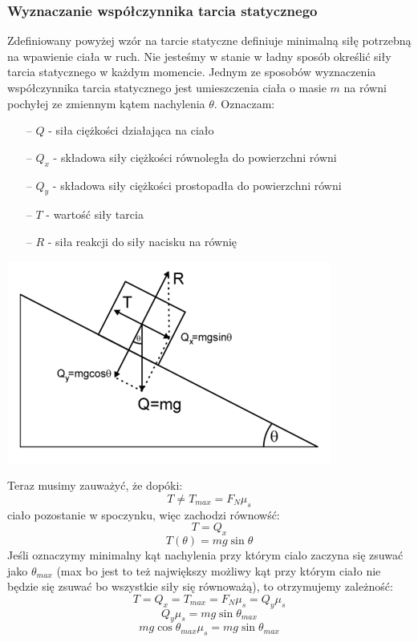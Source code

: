 \documentclass[a4paper]{article}
\begin{document}
    \subsubsection*{Wyznaczanie współczynnika tarcia statycznego}
    Zdefiniowany powyżej wzór na tarcie statyczne definiuje minimalną siłę potrzebną na 
    wpawienie ciała w ruch. Nie jesteśmy w stanie w ładny sposób określić siły tarcia statycznego w 
    każdym momencie.
    Jednym ze sposobów wyznaczenia współczynnika tarcia statycznego jest umieszczenia ciała o masie $m$ 
    na równi pochyłej ze zmiennym kątem nachylenia $\theta$. Oznaczam:
    \begin{itemize}
        \item[--] $Q$ - siła ciężkości działająca na ciało
        \item[--] $Q_x$ - składowa siły ciężkości równoległa do powierzchni równi
        \item[--] $Q_y$ - składowa siły ciężkości prostopadła do powierzchni równi
        \item[--] $T$ - wartość siły tarcia
        \item[--] $R$ - siła reakcji do siły nacisku na równię
    \end{itemize}
    \begin{center}
        \includegraphics{img/rownia.png}
    \end{center}
    Teraz musimy zauważyć, że dopóki:
    \[T \neq T_{max} = F_N\mu_s\]
    ciało pozostanie w spoczynku, więc zachodzi równowść:
    \[T = Q_x\]
    \[T(\theta) = mg\sin \theta\]
    Jeśli oznaczymy minimalny kąt nachylenia przy którym cialo zaczyna się zsuwać jako
    $\theta_{max}$ (max bo jest to też największy możliwy kąt przy którym ciało nie będzie się zsuwać
    bo wszystkie siły się równoważą), to otrzymujemy zależność:
    \[T = Q_x = T_{max} = F_N\mu_s = Q_y\mu_s\]
    \[Q_y\mu_s = mg\sin \theta_{max}\] 
    \[mg\cos\theta_{max}\mu_s = mg\sin \theta_{max}\] 
\end{document}

